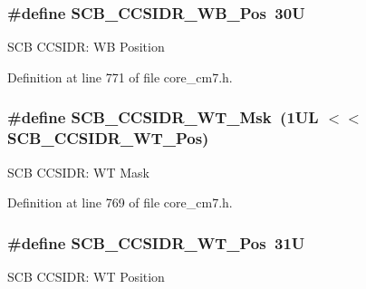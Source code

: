 \subsubsection[{\texorpdfstring{S\+C\+B\+\_\+\+C\+C\+S\+I\+D\+R\+\_\+\+W\+B\+\_\+\+Pos}{SCB_CCSIDR_WB_Pos}}]{\setlength{\rightskip}{0pt plus 5cm}\#define S\+C\+B\+\_\+\+C\+C\+S\+I\+D\+R\+\_\+\+W\+B\+\_\+\+Pos~30U}\hypertarget{group___c_m_s_i_s___s_c_b_ga4a32c31034cf30f6fe4dfaa9d0d6a6af}{}\label{group___c_m_s_i_s___s_c_b_ga4a32c31034cf30f6fe4dfaa9d0d6a6af}
S\+CB C\+C\+S\+I\+DR\+: WB Position 

Definition at line 771 of file core\+\_\+cm7.\+h.

\subsubsection[{\texorpdfstring{S\+C\+B\+\_\+\+C\+C\+S\+I\+D\+R\+\_\+\+W\+T\+\_\+\+Msk}{SCB_CCSIDR_WT_Msk}}]{\setlength{\rightskip}{0pt plus 5cm}\#define S\+C\+B\+\_\+\+C\+C\+S\+I\+D\+R\+\_\+\+W\+T\+\_\+\+Msk~(1\+U\+L $<$$<$ S\+C\+B\+\_\+\+C\+C\+S\+I\+D\+R\+\_\+\+W\+T\+\_\+\+Pos)}\hypertarget{group___c_m_s_i_s___s_c_b_ga9089551a75985fa7cf051062ed2d62b9}{}\label{group___c_m_s_i_s___s_c_b_ga9089551a75985fa7cf051062ed2d62b9}
S\+CB C\+C\+S\+I\+DR\+: WT Mask 

Definition at line 769 of file core\+\_\+cm7.\+h.

\subsubsection[{\texorpdfstring{S\+C\+B\+\_\+\+C\+C\+S\+I\+D\+R\+\_\+\+W\+T\+\_\+\+Pos}{SCB_CCSIDR_WT_Pos}}]{\setlength{\rightskip}{0pt plus 5cm}\#define S\+C\+B\+\_\+\+C\+C\+S\+I\+D\+R\+\_\+\+W\+T\+\_\+\+Pos~31U}\hypertarget{group___c_m_s_i_s___s_c_b_ga4eaf5ef29d920023de2cf53b25d0d56c}{}\label{group___c_m_s_i_s___s_c_b_ga4eaf5ef29d920023de2cf53b25d0d56c}
S\+CB C\+C\+S\+I\+DR\+: WT Position 

